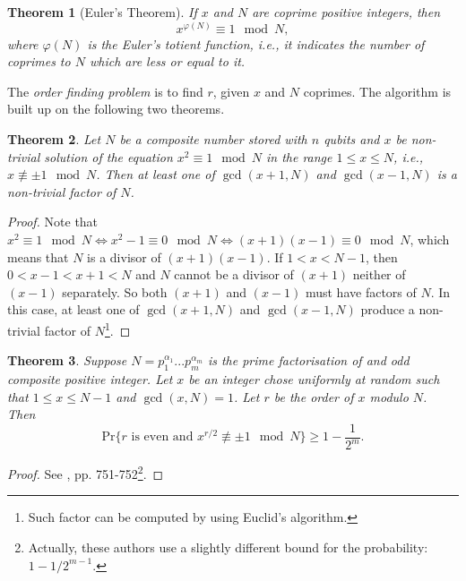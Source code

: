 \documentclass[a4paper, 10pt]{article}
\newtheorem{theorem}{Theorem }[section]
\numberwithin{equation}{section}
\numberwithin{figure}{section}
\numberwithin{table}{section}
\begin{document}
\begin{theorem}[Euler's Theorem]
	If $x$ and $N$ are coprime positive integers, then
	\begin{equation}
		x^{\varphi(N)} \equiv 1 \mod N,
	\end{equation}
	where $\varphi(N)$ is the Euler's totient function, i.e., it indicates the number of coprimes to $N$ which are less or equal to it.
\end{theorem}

The \textit{order finding problem} is to find $r$, given $x$ and $N$ coprimes. The algorithm is built up on the following two theorems.

\begin{theorem}
	Let $N$ be a composite number stored with $n$ qubits and $x$ be non-trivial solution of the equation $x^2 \equiv 1 \mod N$ in the range $1 \le x \le N$, i.e., $x \not\equiv \pm 1 \mod N$. Then at least one of $\gcd(x+1,N)$ and $\gcd(x-1,N)$ is a non-trivial factor of $N$.
\end{theorem}

\begin{proof}
	Note that $x^2 \equiv 1 \mod N \Leftrightarrow x^2-1 \equiv 0 \mod N \Leftrightarrow (x+1)(x-1) \equiv 0 \mod N$, which means that $N$ is a divisor of $(x+1)(x-1)$. If $1<x<N-1$, then $0<x-1<x+1<N$ and $N$ cannot be a divisor of $(x+1)$ neither of $(x-1)$ separately. So both $(x+1)$ and $(x-1)$ must have factors of $N$. In this case, at least one of $\gcd(x+1,N)$ and $\gcd(x-1,N)$ produce a non-trivial factor of $N$\footnote{Such factor can be computed by using Euclid's algorithm.}.
\end{proof}

\begin{theorem}
	Suppose $N = p_{1}^{\alpha_1}...p_{m}^{\alpha_m}$ is the prime factorisation of and odd composite positive integer. Let $x$ be an integer chose uniformly at random such that $1 \le x\le N-1$ and $\gcd(x,N)=1$. Let $r$ be the order of $x$ modulo $N$. Then
	\begin{equation}
		\mathrm{Pr}\{\text{$r$ is even and $x^{r/2}\not\equiv\pm1\mod N$}\} \ge 1-\frac{1}{2^m}.
	\end{equation}
\end{theorem}

\begin{proof}
	See \cite{ekert}, pp. 751-752\footnote{Actually, these authors use a slightly different bound for the probability: $1-1/2^{m-1}$.}.
\end{proof}
\end{document}
